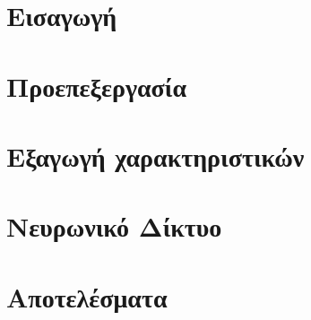 \documentclass[12pt]{article}
\begin{document}
\maketitle \newpage
{}
\tableofcontents \newpage

\section{Εισαγωγή}


\section{Προεπεξεργασία}


\section{Εξαγωγή χαρακτηριστικών}\label{feature_extraction}


\section{Νευρωνικό Δίκτυο}


\section{Αποτελέσματα}


\newpage
\begin{english}
	
	
\end{english}
\end{document}
